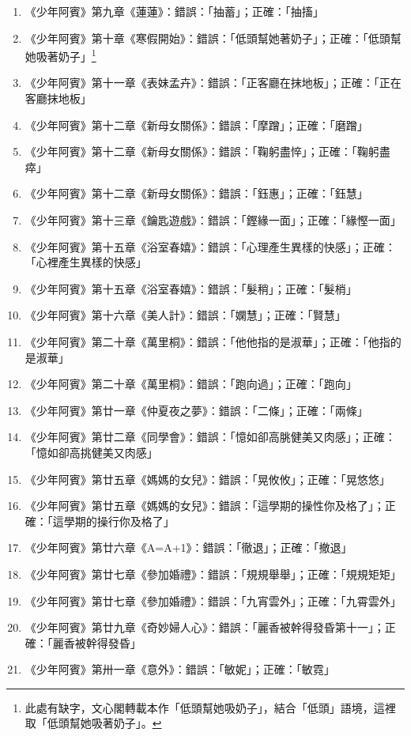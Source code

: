 \begin{enumerate}
\item 《少年阿賓》第九章《蓮蓮》：錯誤：「抽蓄」；正確：「抽搐」
\item 《少年阿賓》第十章《寒假開始》：錯誤：「低頭幫她著奶子」；正確：「低頭幫她吸著奶子」\footnote{此處有缺字，文心閣轉載本作「低頭幫她吸奶子」，結合「低頭」語境，這裡取「低頭幫她吸著奶子」。}
\item 《少年阿賓》第十一章《表妹孟卉》：錯誤：「正客廳在抹地板」；正確：「正在客廳抹地板」
\item 《少年阿賓》第十二章《新母女關係》：錯誤：「摩蹭」；正確：「磨蹭」
\item 《少年阿賓》第十二章《新母女關係》：錯誤：「鞠躬盡悴」；正確：「鞠躬盡瘁」
\item 《少年阿賓》第十二章《新母女關係》：錯誤：「鈺惠」；正確：「鈺慧」
\item 《少年阿賓》第十三章《鑰匙遊戲》：錯誤：「鏗緣一面」；正確：「緣慳一面」
\item 《少年阿賓》第十五章《浴室春嬉》：錯誤：「心理產生異樣的快感」；正確：「心裡產生異樣的快感」
\item 《少年阿賓》第十五章《浴室春嬉》：錯誤：「髮稍」；正確：「髮梢」
\item 《少年阿賓》第十六章《美人計》：錯誤：「嫻慧」；正確：「賢慧」
\item 《少年阿賓》第二十章《萬里桐》：錯誤：「他他指的是淑華」；正確：「他指的是淑華」
\item 《少年阿賓》第二十章《萬里桐》：錯誤：「跑向過」；正確：「跑向」
\item 《少年阿賓》第廿一章《仲夏夜之夢》：錯誤：「二條」；正確：「兩條」
\item 《少年阿賓》第廿二章《同學會》：錯誤：「憶如卻高朓健美又肉感」；正確：「憶如卻高挑健美又肉感」
\item 《少年阿賓》第廿五章《媽媽的女兒》：錯誤：「晃攸攸」；正確：「晃悠悠」
\item 《少年阿賓》第廿五章《媽媽的女兒》：錯誤：「這學期的操性你及格了」；正確：「這學期的操行你及格了」
\item 《少年阿賓》第廿六章《A=A+1》：錯誤：「徹退」；正確：「撤退」
\item 《少年阿賓》第廿七章《參加婚禮》：錯誤：「規規舉舉」；正確：「規規矩矩」
\item 《少年阿賓》第廿七章《參加婚禮》：錯誤：「九宵雲外」；正確：「九霄雲外」
\item 《少年阿賓》第廿九章《奇妙婦人心》：錯誤：「麗香被幹得發昏第十一」；正確：「麗香被幹得發昏」
\item 《少年阿賓》第卅一章《意外》：錯誤：「敏妮」；正確：「敏霓」

\end{enumerate}
